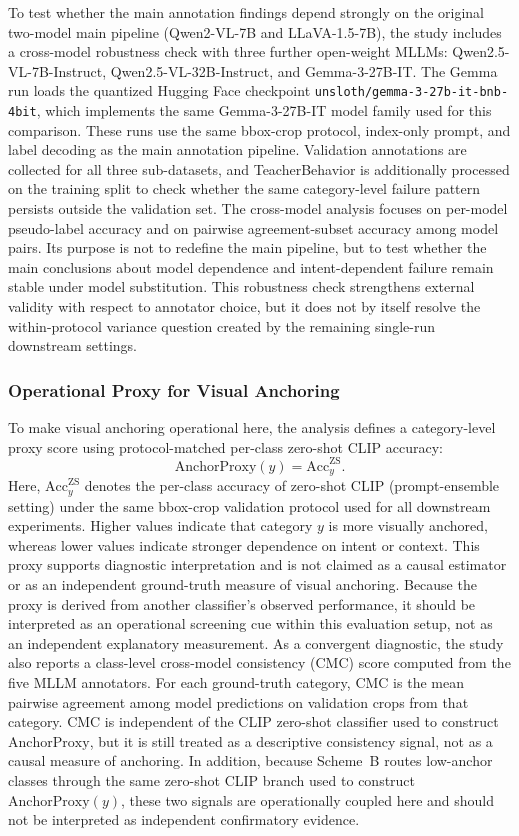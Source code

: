 \documentclass{ieeeaccess}
\begin{document}
To test whether the main annotation findings depend strongly on the
original two-model main pipeline (Qwen2-VL-7B and LLaVA-1.5-7B), the study includes a
cross-model robustness check with three further open-weight MLLMs:
Qwen2.5-VL-7B-Instruct, Qwen2.5-VL-32B-Instruct, and Gemma-3-27B-IT.
The Gemma run loads the quantized Hugging Face checkpoint
\texttt{unsloth/gemma-3-27b-it-bnb-4bit}, which implements the same
Gemma-3-27B-IT model family used for this comparison.
These runs use the same bbox-crop protocol, index-only prompt, and
label decoding as the main annotation pipeline.
Validation annotations are collected for all three sub-datasets, and
TeacherBehavior is additionally processed on the training split to
check whether the same category-level failure pattern persists outside
the validation set.
The cross-model analysis focuses on per-model pseudo-label accuracy and
on pairwise agreement-subset accuracy among model pairs.
Its purpose is not to redefine the main pipeline, but to test whether
the main conclusions about model dependence and intent-dependent
failure remain stable under model substitution.
This robustness check strengthens external validity with
respect to annotator choice, but it does not by itself resolve the
within-protocol variance question created by the remaining
single-run downstream settings.

\subsubsection{Operational Proxy for Visual Anchoring}

To make visual anchoring operational here, the analysis
defines a category-level proxy score using protocol-matched per-class
zero-shot CLIP accuracy:
\[
\mathrm{AnchorProxy}(y)=\mathrm{Acc}^{\mathrm{ZS}}_{y}.
\]
Here, $\mathrm{Acc}^{\mathrm{ZS}}_{y}$ denotes the per-class accuracy of
zero-shot CLIP (prompt-ensemble setting) under the same bbox-crop
validation protocol used for all downstream experiments.
Higher values indicate that category $y$ is more visually anchored,
whereas lower values indicate stronger dependence on intent or context.
This proxy supports diagnostic interpretation and is not claimed as
a causal estimator or as an independent ground-truth measure of visual
anchoring.
Because the proxy is derived from another classifier's observed
performance, it should be interpreted as an operational screening cue
within this evaluation setup, not as an independent explanatory
measurement.
As a convergent diagnostic, the study also reports a class-level
cross-model consistency (CMC) score computed from the five MLLM
annotators. For each ground-truth category, CMC is the mean pairwise
agreement among model predictions on validation crops from that
category. CMC is independent of the CLIP zero-shot classifier used to
construct $\mathrm{AnchorProxy}$, but it is still treated as a
descriptive consistency signal, not as a causal measure of
anchoring.
In addition, because Scheme~B routes low-anchor classes through the
same zero-shot CLIP branch used to construct
$\mathrm{AnchorProxy}(y)$, these two signals are operationally
coupled here and should not be interpreted as independent
confirmatory evidence.
\end{document}
